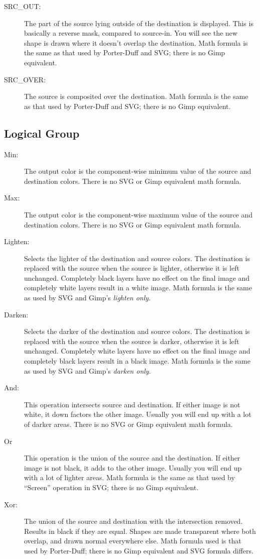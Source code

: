 \begin{description}
    \item[SRC\_OUT:] The part of the source lying outside of the destination is displayed.  This is basically a reverse mask, compared to source-in.  You will see the new shape is drawn where it doesn't overlap the destination.  Math formula is the same as that used by Porter-Duff and SVG; there is no Gimp equivalent.
    \item[SRC\_OVER:] The source is composited over the destination.  Math formula is the same as that used by Porter-Duff and SVG; there is no Gimp equivalent.
\end{description}

\subsection*{Logical Group}%
\label{sub:logical_group}

\begin{description}
    \item[Min:] The output color is the component-wise minimum value of the source and destination colors.  There is no SVG or Gimp equivalent math formula.
    \item[Max:] The output color is the component-wise maximum value of the source and destination colors. There is no SVG or Gimp equivalent math formula.
    \item[Lighten:] Selects the lighter of the destination and source colors.  The destination is replaced with the source when the source is lighter, otherwise it is left unchanged.  Completely black layers have no effect on the final image and completely white layers result in a white image.  Math formula is the same as used by SVG and Gimp's \textit{lighten only}.
    \item[Darken:] Selects the darker of the destination and source colors. The destination is replaced with the source when the source is darker, otherwise it is left unchanged.  Completely white layers have no effect on the final image and completely black layers result in a black image.  Math formula is the same as used by SVG and Gimp's \textit{darken only}.
    \item[And:] This operation intersects source and destination.  If either image is not white, it down factors the other image.  Usually you will end up with a lot of darker areas.  There is no SVG or Gimp equivalent math formula.
    \item[Or] This operation is the union of the source and the destination.  If either image is not black, it adds to the other image.  Usually you will end up with a lot of lighter areas.  Math formula is the same as that used by “Screen” operation in SVG; there is no Gimp equivalent.
    \item[Xor:] The union of the source and destination with the intersection removed.  Results in black if they are equal.  Shapes are made transparent where both overlap, and drawn normal everywhere else.  Math formula used is that used by Porter-Duff; there is no Gimp equivalent and SVG formula differs.
\end{description}

